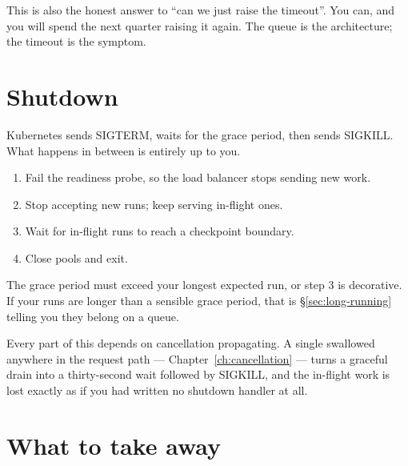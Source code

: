 \begin{note}
This is also the honest answer to ``can we just raise the timeout''. You can, and
you will spend the next quarter raising it again. The queue is the architecture;
the timeout is the symptom.
\end{note}

\section{Shutdown}
\label{sec:shutdown}

Kubernetes sends SIGTERM, waits for the grace period, then sends SIGKILL. What
happens in between is entirely up to you.

\begin{enumerate}[leftmargin=1.4em,nosep]
\item Fail the readiness probe, so the load balancer stops sending new work.
\item Stop accepting new runs; keep serving in-flight ones.
\item Wait for in-flight runs to reach a checkpoint boundary.
\item Close pools and exit.
\end{enumerate}

The grace period must exceed your longest expected run, or step 3 is decorative.
If your runs are longer than a sensible grace period, that is
\S\ref{sec:long-running} telling you they belong on a queue.

\begin{warning}
Every part of this depends on cancellation propagating. A single swallowed
 anywhere in the request path --- Chapter~\ref{ch:cancellation}
--- turns a graceful drain into a thirty-second wait followed by SIGKILL, and the
in-flight work is lost exactly as if you had written no shutdown handler at all.
\end{warning}

\section{What to take away}
\label{sec:ch13-summary}

